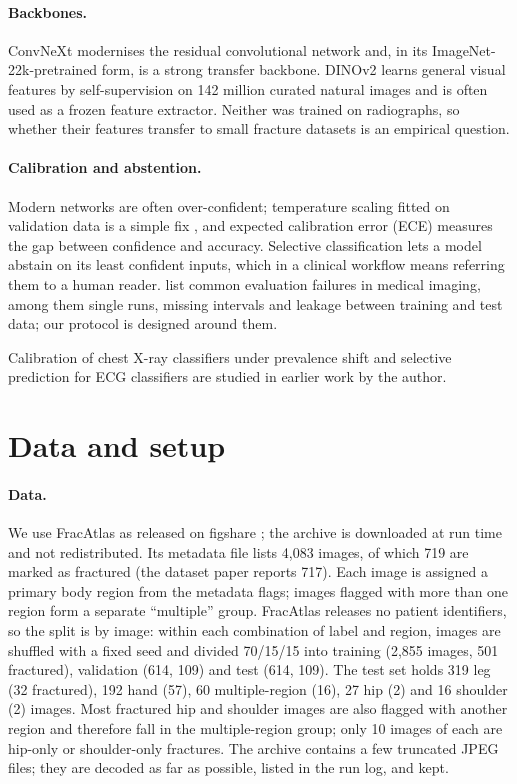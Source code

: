 \documentclass[11pt,a4paper]{article}
\begin{document}
\paragraph{Backbones.} ConvNeXt \citep{liu2022convnext} modernises the residual convolutional network and, in its
ImageNet-22k-pretrained form, is a strong transfer backbone. DINOv2 \citep{oquab2024dinov2} learns general visual
features by self-supervision on 142 million curated natural images and is often used as a frozen feature extractor.
Neither was trained on radiographs, so whether their features transfer to small fracture datasets is an empirical
question.

\paragraph{Calibration and abstention.} Modern networks are often over-confident; temperature scaling fitted on
validation data is a simple fix \citep{guo2017calibration}, and expected calibration error (ECE)
\citep{naeini2015ece} measures the gap between confidence and accuracy. Selective classification
\citep{geifman2017selective} lets a model abstain on its least confident inputs, which in a clinical workflow means
referring them to a human reader. \citet{varoquaux2022failures} list common evaluation failures in medical imaging,
among them single runs, missing intervals and leakage between training and test data; our protocol is designed
around them.

Calibration of chest X-ray classifiers under prevalence shift \citep{hussain2026lung} and selective prediction for ECG classifiers \citep{hussain2026ptbxl} are studied in earlier work by the author.

\section{Data and setup}

\paragraph{Data.} We use FracAtlas as released on figshare \citep{abedeen2023fracatlas}; the archive is downloaded at
run time and not redistributed. Its metadata file lists 4,083 images, of which 719 are marked as fractured (the
dataset paper reports 717). Each image is assigned a primary body region from the metadata flags; images flagged with
more than one region form a separate ``multiple'' group. FracAtlas releases no patient identifiers, so the split is
by image: within each combination of label and region, images are shuffled with a fixed seed and divided 70/15/15
into training (2,855 images, 501 fractured), validation (614, 109) and test (614, 109). The test set holds 319 leg
(32 fractured), 192 hand (57), 60 multiple-region (16), 27 hip (2) and 16 shoulder (2) images. Most fractured hip and
shoulder images are also flagged with another region and therefore fall in the multiple-region group; only 10 images
of each are hip-only or shoulder-only fractures. The archive contains a few truncated JPEG files; they
are decoded as far as possible, listed in the run log, and kept.
\end{document}
